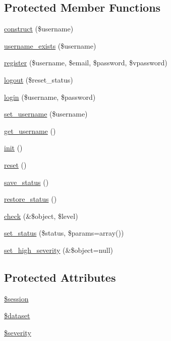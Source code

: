 \subsection*{Protected Member Functions}
\begin{DoxyCompactItemize}
\item 
\hyperlink{classUserHandler_ae471fe5473119da7089886c27ad5a3e9}{construct} (\$username)
\item 
\hyperlink{classUserHandler_a4b50cc703608c490080b25c5b2ae3418}{username\_\-exists} (\$username)
\item 
\hyperlink{classUserHandler_a7fbe37f478bf35e0570db3296529e2a4}{register} (\$username, \$email, \$password, \$vpassword)
\item 
\hyperlink{classUserHandler_a0bcf46a5b0c4a5b495cba98b8da02b7b}{logout} (\$reset\_\-status)
\item 
\hyperlink{classUserHandler_abf6562660ee8ec1663afe08550a63643}{login} (\$username, \$password)
\item 
\hyperlink{classUserHandler_afbcc9a275b547cca0bd4cff567b054a0}{set\_\-username} (\$username)
\item 
\hyperlink{classUserHandler_a76e8c8b88c8d92f2d03645e810b9253c}{get\_\-username} ()
\item 
\hyperlink{class__OWL_ae0ef3ded56e8a6b34b6461e5a721cd3e}{init} ()
\item 
\hyperlink{class__OWL_a2f2a042bcf31965194c03033df0edc9b}{reset} ()
\item 
\hyperlink{class__OWL_a9e49b9c76fbc021b244c6915ea536d71}{save\_\-status} ()
\item 
\hyperlink{class__OWL_a465eeaf40edd9f9c848841700c32ce55}{restore\_\-status} ()
\item 
\hyperlink{class__OWL_ad6f4f6946f40199dd0333cf219fa500e}{check} (\&\$object, \$level)
\item 
\hyperlink{class__OWL_aea912d0ede9b3c2a69b79072d94d4787}{set\_\-status} (\$status, \$params=array())
\item 
\hyperlink{class__OWL_a576829692a3b66e3d518853bf43abae3}{set\_\-high\_\-severity} (\&\$object=null)
\end{DoxyCompactItemize}
\subsection*{Protected Attributes}
\begin{DoxyCompactItemize}
\item 
\hyperlink{classUserHandler_af097b7fd1ee085b46a6c34e071508a7f}{\$session}
\item 
\hyperlink{classUserHandler_ac38c1ea50b2820ed03781bdbe8eb2e08}{\$dataset}
\item 
\hyperlink{class__OWL_ad26b40a9dbbacb33e299b17826f8327c}{\$severity}
\end{DoxyCompactItemize}
